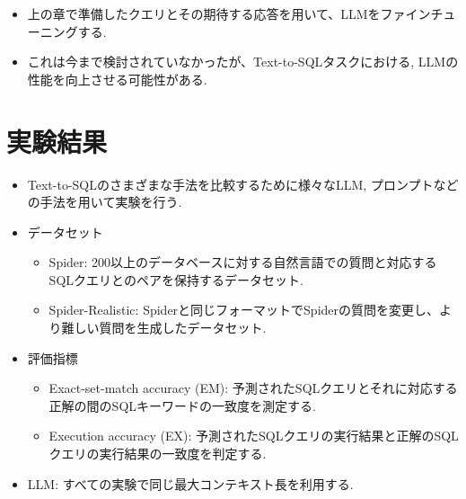 \documentclass[dvipdfmx,uplatex]{jsarticle}
\theoremstyle{remark}
\newenvironment{method}[1]{
    \begin{tcolorbox}[
        colframe=green!50!black,
        colback=green!50!black!10!white,
        colbacktitle=green!50!black!40!white,
        coltitle=black,
        fonttitle=\bfseries,
        title={#1}
    ]
}{
    \end{tcolorbox}
}
\newenvironment{experiment}[1]{
    \begin{tcolorbox}[
        colframe=violet,
        colback=violet!10!white,
        colbacktitle=violet!40!white,
        coltitle=black,
        fonttitle=\bfseries,
        title={#1}
    ]
}{
    \end{tcolorbox}
}
\begin{document}
\begin{method}{Supervised Fine-tuning}
\begin{itemize}
    \item 上の章で準備したクエリとその期待する応答を用いて、LLMをファインチューニングする.
    \item これは今まで検討されていなかったが、Text-to-SQLタスクにおける, LLMの性能を向上させる可能性がある.
\end{itemize}
\end{method}

\section{実験結果}
\begin{experiment}{実験手法}
\begin{itemize}
    \item Text-to-SQLのさまざまな手法を比較するために様々なLLM, プロンプトなどの手法を用いて実験を行う.
    \item データセット
    \begin{itemize}
        \item Spider: 200以上のデータベースに対する自然言語での質問と対応するSQLクエリとのペアを保持するデータセット.
        \item Spider-Realistic: Spiderと同じフォーマットでSpiderの質問を変更し、より難しい質問を生成したデータセット.
    \end{itemize}
    \item 評価指標
    \begin{itemize}
        \item Exact-set-match accuracy (EM): 予測されたSQLクエリとそれに対応する正解の間のSQLキーワードの一致度を測定する.
        \item Execution accuracy (EX): 予測されたSQLクエリの実行結果と正解のSQLクエリの実行結果の一致度を判定する.
    \end{itemize}
    \item LLM: すべての実験で同じ最大コンテキスト長を利用する.
\end{itemize}
\end{experiment}
\end{document}
